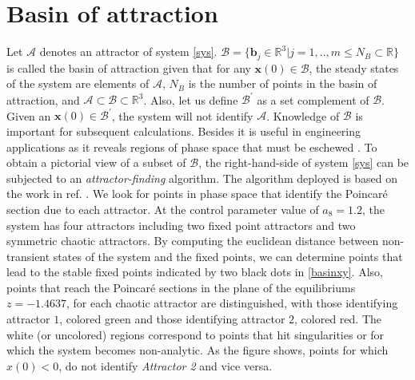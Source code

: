 \documentclass[final,5p,times,twocolumn]{elsarticle}
\begin{document}
\section{Basin of attraction}
\label{BA}
Let $\mathcal{A}$ denotes an attractor of system \eqref{sys}. $\mathcal{B} = \{\bm{b}_j\in\mathbb{R}^3\vert j=1,..,m\le N_B\subset\mathbb{R}\}$ is called the basin of attraction given that for any $\bm{x}(0)\in\mathcal{B}$, the steady states of the system are elements of $\mathcal{A}$, $N_B$ is the number of points in the basin of attraction, and $\mathcal{A}\subset\mathcal{B}\subset\mathbb{R}^3$. Also, let us define $\mathcal{B}^{\prime}$ as a set complement of $\mathcal{B}$. Given an $\bm{x}(0)\in\mathcal{B}^{\prime}$, the system will not identify $\mathcal{A}$. Knowledge of $\mathcal{B}$ is important for subsequent calculations. Besides it is useful in engineering applications as it reveals regions of phase space that must be eschewed \cite{sprott2015classifying}. To obtain a pictorial view of a subset of $\mathcal{B}$, the right-hand-side of system \eqref{sys} can be subjected to an \textit{attractor-finding} algorithm. The algorithm deployed is based on the work in ref. \cite{sprott2015classifying}. We look for points in phase space that identify the Poincar\'e section due to each attractor. At the control parameter value of $a_8 = 1.2$, the system has four attractors including two fixed point attractors and two symmetric chaotic attractors. By computing the euclidean distance between non-transient states of the system and the fixed points, we can determine points that lead to the stable fixed points indicated by two black dots in \cref{basinxy}. Also, points that reach the Poincar\'e sections in the plane of the equilibriums $z = -1.4637$, for each chaotic attractor are distinguished, with those identifying attractor $1$, colored green and those identifying attractor $2$, colored red. The white (or uncolored) regions correspond to points that hit singularities or for which the system becomes non-analytic. As the figure shows, points for which $x(0)<0$, do not identify \textit{Attractor 2} and vice versa.%
\end{document}
